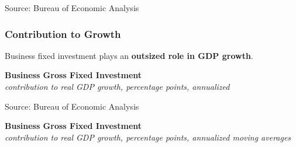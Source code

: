 \documentclass{report}
\makeatletter
\newcommand{\tbllink}[1]{\href{https://raw.githubusercontent.com/bdecon/US-chartbook/master/chartbook/data/#1}{\faTable}}
\newcommand*\short[1]{\expandafter\@gobbletwo\number\numexpr#1\relax}
\newcommand{\sbar}[4]{
		\addplot[ybar stacked, bar width=2.3pt, draw opacity=0, fill=#1] 
			table [x=#2, y=#3, col sep=comma]{#4};}
\newcommand{\dateaxisticks}{
		date coordinates in=x, axis line style={draw=none},
		xmax={2024-01-31},
		max space between ticks=40,	    
		xtick={{1990-01-01}, {1992-01-01}, {1994-01-01}, 
			{1996-01-01}, {1998-01-01}, {2000-01-01}, 
			{2002-01-01}, {2004-01-01}, {2006-01-01},
			{2008-01-01}, {2010-01-01}, {2012-01-01}, {2014-01-01},
		    {2016-01-01}, {2018-01-01}, {2020-01-01}, {2022-01-01}, 
		    {2024-01-01}, {2026-01-01}},
		minor xtick={{1989-01-01}, {1991-01-01}, {1993-01-01},
			{1995-01-01}, {1997-01-01}, {1999-01-01}, 
			{2001-01-01}, {2003-01-01}, {2005-01-01}, {2007-01-01},
		    {2009-01-01}, {2011-01-01}, {2013-01-01}, {2015-01-01},
		    {2017-01-01}, {2019-01-01}, {2021-01-01}, {2023-01-01}, 
		    {2025-01-01}, {2027-01-01}},
		enlarge y limits={0.06}, enlarge x limits={0.01},
		xticklabel style={align=center, yshift=-2pt}, tick label style={inner sep=0pt},
		}
\newcommand{\bbar}[2]{extra #1 ticks = {{#2}}, extra #1 tick labels = ,
		extra #1 tick style = {grid=major, grid style={thick, black!25}},}
\newcommand{\rbars}{
		\fill[color=black!10] (axis cs:{1990-07-01},\pgfkeysvalueof{/pgfplots/ymin})
			rectangle (axis cs:{1991-03-01}, \pgfkeysvalueof{/pgfplots/ymax});
		\fill[color=black!10] (axis cs:{2007-12-01},\pgfkeysvalueof{/pgfplots/ymin})
			rectangle (axis cs:{2009-07-01}, \pgfkeysvalueof{/pgfplots/ymax});
		\fill[color=black!10] (axis cs:{2001-03-01},\pgfkeysvalueof{/pgfplots/ymin})
			rectangle (axis cs:{2001-11-01}, \pgfkeysvalueof{/pgfplots/ymax});
		\fill[color=black!10] (axis cs:{2020-02-01},\pgfkeysvalueof{/pgfplots/ymin})
			rectangle (axis cs:{2020-05-01}, \pgfkeysvalueof{/pgfplots/ymax});}
\makeatother
\begin{document}
{\begin{minipage}{0.425\textwidth}
\footnotesize{Source: Bureau of Economic Analysis} \hfill \tbllink{businvsh.csv}
\end{minipage}
\vspace*{-1mm}

\begin{minipage}{1.0\textwidth}
\subsubsection*{Contribution to Growth}
\vspace{-1mm}

\small Business fixed investment plays an \textbf{outsized role in GDP growth}.  
\vspace{0.5mm}

\normalsize \textbf{Business Gross Fixed Investment}\\
\footnotesize{\textit{contribution to real GDP growth, percentage points, annualized}}
\vspace{3.0cm}

\hspace{2mm} 

\footnotesize{Source: Bureau of Economic Analysis} \hfill \tbllink{businv.csv}
\vspace{1.5mm}

\normalsize \textbf{Business Gross Fixed Investment}\\
\footnotesize{\textit{contribution to real GDP growth, percentage points, annualized \hspace{18mm} moving averages}}\\ 
 \setlength{\tabcolsep}{3.6pt} \color{black!90}
		{\renewcommand{\arraystretch}{1.5}
\hspace*{-2mm} \begin{tabular}{p{40.6mm} R{6.7mm} R{6.7mm} R{6.7mm} R{6.7mm} R{6.7mm} 
		   R{7.6mm} R{6.7mm} R{6.7mm} }
			  \hline
		\end{tabular}} \vspace{-2mm}
				

\end{minipage}}
\end{document}
